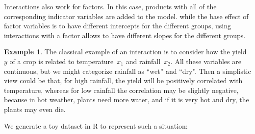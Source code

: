 \documentclass[
  a4paper,
]{article}
\newenvironment{Shaded}{\begin{snugshade}}{\end{snugshade}}
\newcommand{\AttributeTok}[1]{\textcolor[rgb]{0.13,0.29,0.53}{#1}}
\newcommand{\DecValTok}[1]{\textcolor[rgb]{0.00,0.00,0.81}{#1}}
\newcommand{\FunctionTok}[1]{\textcolor[rgb]{0.13,0.29,0.53}{\textbf{#1}}}
\newcommand{\NormalTok}[1]{#1}
\newcommand{\OtherTok}[1]{\textcolor[rgb]{0.56,0.35,0.01}{#1}}
\newcommand{\SpecialCharTok}[1]{\textcolor[rgb]{0.81,0.36,0.00}{\textbf{#1}}}
\newcommand{\StringTok}[1]{\textcolor[rgb]{0.31,0.60,0.02}{#1}}
\theoremstyle{definition}
\theoremstyle{definition}
\newtheorem{example}{Example}[section]
\theoremstyle{definition}
\theoremstyle{definition}
\theoremstyle{remark}
\begin{document}
Interactions also work for factors. In this case, products with all of
the corresponding indicator variables are added to the model. while
the base effect of factor variables is to have different intercepts for
the different groups, using interactions with a factor allows to have
different slopes for the different groups.

\begin{example}
The classical example of an interaction is to consider how the
yield~\(y\) of a crop is related to temperature~\(x_1\) and rainfall~\(x_2\).
All these variables are continuous, but we might categorize rainfall as ``wet''
and ``dry''. Then a simplistic view could be that, for high rainfall, the yield
will be positively correlated with temperature, whereas for low rainfall the
correlation may be slightly negative, because in hot weather, plants need more
water, and if it is very hot and dry, the plants may even die.

We generate a toy dataset in R to represent such a situation:

\begin{Shaded}
\end{Shaded}


\end{example}
\end{document}
